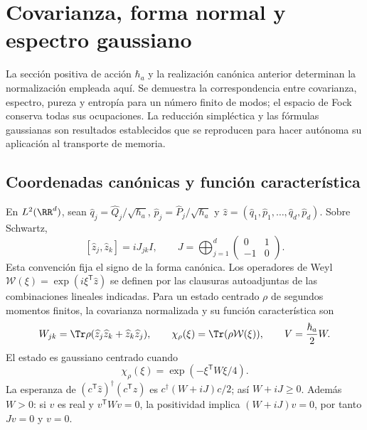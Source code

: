 \chapter{Covarianza, forma normal y espectro gaussiano}
\label{x_reciprocidad:app:gaussianas-espectro}

La sección positiva de acción \(\hbar_a\) y la realización canónica
anterior determinan la normalización empleada aquí. Se demuestra la
correspondencia entre covarianza, espectro, pureza y entropía para un
número finito de modos; el espacio de Fock conserva todas sus ocupaciones.
La reducción simpléctica y las fórmulas gaussianas son resultados
establecidos que se reproducen para hacer autónoma su aplicación al
transporte de memoria.

\section{Coordenadas canónicas y función característica}
En \(L^2(\RR^d)\), sean \(\widehat q_j=\widehat Q_j/\sqrt{\hbar_a}\),
\(\widehat p_j=\widehat P_j/\sqrt{\hbar_a}\) y
\(\widehat z=(\widehat q_1,\widehat p_1,\ldots,\widehat q_d,\widehat p_d)\).
Sobre Schwartz,
\[
 [\widehat z_j,\widehat z_k]=iJ_{jk}I,\qquad
 J=\bigoplus_{j=1}^d\begin{pmatrix}0&1\\-1&0\end{pmatrix}.
\]
Esta convención fija el signo de la forma canónica. Los operadores de
Weyl \(\mathcal W(\xi)=\exp(i\xi^{\mathsf T}\widehat z)\) se definen
por las clausuras autoadjuntas de las combinaciones lineales indicadas.
Para un estado centrado \(\rho\) de segundos momentos finitos, la
covarianza normalizada y su función característica son
\[
 W_{jk}=\Tr\rho(\widehat z_j\widehat z_k+\widehat z_k\widehat z_j),
 \qquad \chi_\rho(\xi)=\Tr(\rho\mathcal W(\xi)),\qquad
 V=\frac{\hbar_a}{2}W.
\]
El estado es gaussiano centrado cuando
\begin{equation}
 \chi_\rho(\xi)=\exp(-\xi^{\mathsf T}W\xi/4).
 \label{x_reciprocidad:app:eq:caracteristica-gaussiana}
\end{equation}
La esperanza de \((c^{\mathsf T}\widehat z)^\dagger
(c^{\mathsf T}\widehat z)\) es \(c^\dagger(W+iJ)c/2\); así
\(W+iJ\geq0\). Además \(W>0\): si \(v\) es real y
\(v^{\mathsf T}Wv=0\), la positividad implica \((W+iJ)v=0\),
por tanto \(Jv=0\) y \(v=0\).

